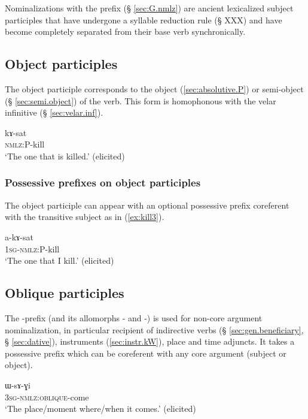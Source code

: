 Nominalizations with the  prefix (§ \ref{sec:G.nmlz}) are ancient lexicalized subject participles that have undergone a syllable reduction rule (§ XXX) and have become completely separated from their base verb synchronically.

\subsection{Object participles}
The object participle corresponds to the object (\ref{sec:absolutive.P}) or semi-object (§ \ref{sec:semi.object}) of the verb. This form is homophonous with the velar infinitive (§ \ref{sec:velar.inf}).

 \begin{exe} 
\ex \label{ex:kill2}
\gll kɤ-sat    \\
   \textsc{nmlz}:P-kill \\
 \glt  `The one that is killed.' (elicited)
 \end{exe}
 
\subsubsection{Possessive prefixes on object participles}  \label{ex:object.participle.possessive} 
 
The object participle can appear with an optional possessive prefix coreferent with the transitive subject as in (\ref{ex:kill3}).
  
  \begin{exe}
\ex \label{ex:kill3}
\gll a-kɤ-sat    \\
   \textsc{1sg-nmlz}:P-kill \\
 \glt  `The one that I kill.' (elicited)
 \end{exe}

\subsection{Oblique participles}
The -prefix (and its allomorphs - and -) is used for non-core argument nominalization, in particular recipient of indirective verbs (§ \ref{sec:gen.beneficiary}, § \ref{sec:dative}), instruments (\ref{sec:instr.kW}), place and time adjuncts. It takes a possessive prefix which can be coreferent with any core argument (subject or object).

   \begin{exe}
\ex \label{ex:come}
\gll ɯ-sɤ-ɣi    \\
   \textsc{3sg-nmlz:oblique}-come \\
 \glt  `The place/moment where/when it comes.' (elicited)
 \end{exe}
 
